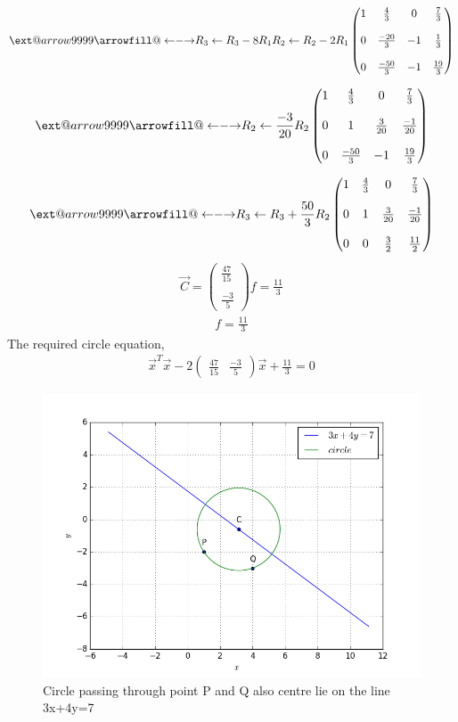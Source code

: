 \documentclass[journal,12pt,twocolumn]{IEEEtran}
\makeatletter
\newcommand\xleftrightarrow[2][]{%
  \ext@arrow 9999{\longleftrightarrowfill@}{#1}{#2}}
\newcommand\longleftrightarrowfill@{%
  \arrowfill@\leftarrow\relbar\rightarrow}
\newcommand{\myvec}[1]{\ensuremath{\begin{pmatrix}#1\end{pmatrix}}}
\makeatother
\begin{document}
\begin{align}
\xleftrightarrow[R_3\leftarrow R_3 - 8R_1]{R_2\leftarrow R_2 - 2R_1}
\myvec{1 & \frac{4}{3} & 0 & \frac{7}{3}\\ \\
0 & \frac{-20}{3} & -1 & \frac{1}{3} \\ \\
0 & \frac{-50}{3} & -1 & \frac{19}{3}}
\end{align}

\begin{align}
\xleftrightarrow{R_2\leftarrow \frac{-3}{20}R_2 }
\myvec{1 & \frac{4}{3} & 0 & \frac{7}{3}\\ \\
0 & 1 & \frac{3}{20} & \frac{-1}{20} \\ \\
0 & \frac{-50}{3} & -1 & \frac{19}{3}}
\end{align}

\begin{align}
\xleftrightarrow{R_3\leftarrow R_3 + \frac{50}{3}R_2}
\myvec{1 & \frac{4}{3} & 0 & \frac{7}{3}\\ \\
0 & 1 & \frac{3}{20} & \frac{-1}{20} \\ \\
0 & 0 & \frac{3}{2} & \frac{11}{2}}
\end{align}
\begin{align}
\vec{C} = \myvec{\frac{47}{15}  \\ \\ \frac{-3}{5} }
f = \frac{11}{3}
\end{align}
\begin{align}
f = \frac{11}{3}
\end{align}
The required circle equation,
\begin{align}
\vec{x}^T\vec{x}-2\myvec{\frac{47}{15} & \frac{-3}{5} }\vec{x} + \frac{11}{3} = 0
\end{align}

\begin{figure}[!ht]
\centering
\includegraphics[width=\columnwidth]{figure.png}
\caption{Circle passing through point P and Q also centre lie on the line 3x+4y=7}
\label{Fig}
\end{figure}
\end{document}
